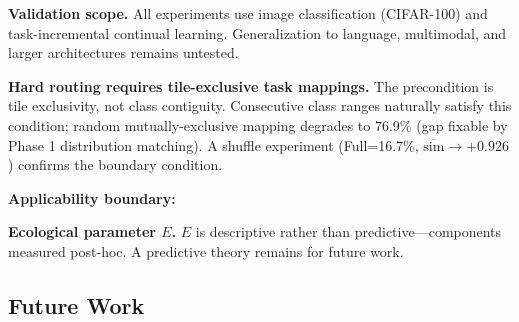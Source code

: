 \documentclass[twoside]{article}
\theoremstyle{definition}
\begin{document}
\textbf{Validation scope.} All experiments use image classification (CIFAR-100) and task-incremental continual learning. Generalization to language, multimodal, and larger architectures remains untested.

\textbf{Hard routing requires tile-exclusive task mappings.} The precondition is tile exclusivity, not class contiguity. Consecutive class ranges naturally satisfy this condition; random mutually-exclusive mapping degrades to 76.9\% (gap fixable by Phase 1 distribution matching). A shuffle experiment (Full=16.7\%, $\overline{\text{sim}}\to+0.926$) confirms the boundary condition.

\textbf{Applicability boundary:}

\begin{table}[ht]
\centering
\caption{Deployment scenarios for Tile v3}
\end{table}

\textbf{Ecological parameter $E$.} $E$ is descriptive rather than predictive---components measured post-hoc. A predictive theory remains for future work.

\subsection{Future Work}
\end{document}
